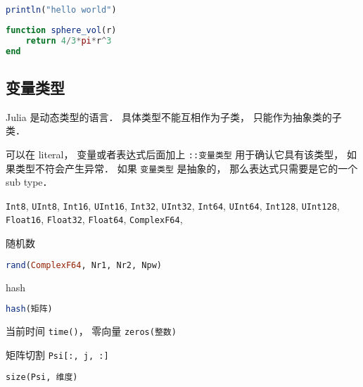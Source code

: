 
\begin{issues}
\issueDraft
\end{issues}

\begin{lstlisting}[language=julia]
println("hello world")
\end{lstlisting}

\begin{lstlisting}[language=julia]
function sphere_vol(r)
    return 4/3*pi*r^3
end
\end{lstlisting}

\subsection{变量类型}



Julia 是动态类型的语言． 具体类型不能互相作为子类， 只能作为抽象类的子类．

可以在 literal， 变量或者表达式后面加上 \verb|::变量类型| 用于确认它具有该类型， 如果类型不符会产生异常． 如果 \verb|变量类型| 是抽象的， 那么表达式只需要是它的一个 sub type．

\verb|Int8|, \verb|UInt8|, \verb|Int16|, \verb|UInt16|, \verb|Int32|, \verb|UInt32|, \verb|Int64|, \verb|UInt64|, \verb|Int128|, \verb|UInt128|, \verb|Float16|, \verb|Float32|, \verb|Float64|, \verb|ComplexF64|, 

随机数
\begin{lstlisting}[language=julia]
rand(ComplexF64, Nr1, Nr2, Npw)
\end{lstlisting}

hash
\begin{lstlisting}[language=julia]
hash(矩阵)
\end{lstlisting}

当前时间 \verb|time()|， 零向量 \verb|zeros(整数)|

矩阵切割 \verb|Psi[:, j, :]|

\verb|size(Psi, 维度)|
